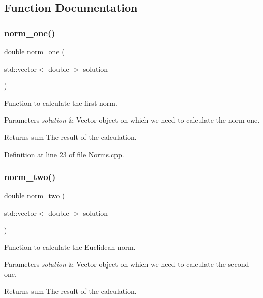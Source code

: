\subsection{Function Documentation}
\mbox{\label{_norms_8h_a4eb114881aa581e7043bd66e04ba27d0}} 
\subsubsection{norm\+\_\+one()}
{\footnotesize\ttfamily double norm\+\_\+one (\begin{DoxyParamCaption}\item[{std\+::vector$<$ double $>$}]{solution }\end{DoxyParamCaption})}



Function to calculate the first norm. 


\begin{DoxyParams}{Parameters}
{\em solution} & Vector object on which we need to calculate the norm one. \\
\hline
\end{DoxyParams}
\begin{DoxyReturn}{Returns}
sum The result of the calculation. 
\end{DoxyReturn}


Definition at line 23 of file Norms.\+cpp.

\mbox{\label{_norms_8h_a640d4f250d9b19707f3beef13f540f20}} 
\subsubsection{norm\+\_\+two()}
{\footnotesize\ttfamily double norm\+\_\+two (\begin{DoxyParamCaption}\item[{std\+::vector$<$ double $>$}]{solution }\end{DoxyParamCaption})}



Function to calculate the Euclidean norm. 


\begin{DoxyParams}{Parameters}
{\em solution} & Vector object on which we need to calculate the second one. \\
\hline
\end{DoxyParams}
\begin{DoxyReturn}{Returns}
sum The result of the calculation. 
\end{DoxyReturn}


